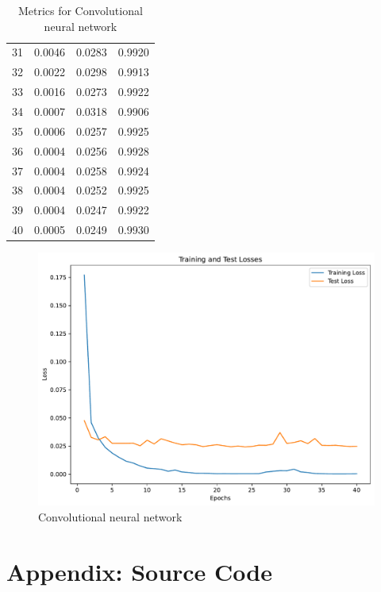 \documentclass[a4paper]{article}
\begin{document}
\begin{table}
\begin{center}
\begin{tabular}{ l|l|l|l }
    31 & 0.0046 & 0.0283 & 0.9920 \\
    32 & 0.0022 & 0.0298 & 0.9913 \\
    33 & 0.0016 & 0.0273 & 0.9922 \\
    34 & 0.0007 & 0.0318 & 0.9906 \\
    35 & 0.0006 & 0.0257 & 0.9925 \\
    36 & 0.0004 & 0.0256 & 0.9928 \\
    37 & 0.0004 & 0.0258 & 0.9924 \\
    38 & 0.0004 & 0.0252 & 0.9925 \\
    39 & 0.0004 & 0.0247 & 0.9922 \\
    40 & 0.0005 & 0.0249 & 0.9930 \\
  \end{tabular}
\end{center}
\caption{Metrics for Convolutional neural network}
  \label{tabular:convolutional_neural_network_metrics}
\end{table}


\begin{figure}[H]
  \begin{center}
    \includegraphics[width=\textwidth]{ola/cnn.pdf}
    \caption{Convolutional neural network}
    \label{fig:convolutional_neural_network}
  \end{center}
\end{figure}


\newpage


\printbibliography

\section*{Appendix: Source Code}




\end{document}
